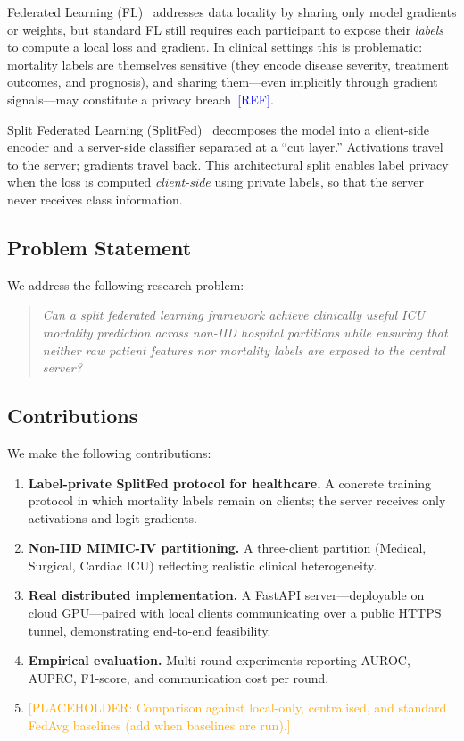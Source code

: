 \documentclass[10pt,twocolumn]{article}
\newcommand{\placeholder}[1]{\textcolor{orange}{[PLACEHOLDER: #1]}}
\newcommand{\refneeded}{\textcolor{blue}{[REF]}}
\begin{document}
Federated Learning (FL)~\cite{mcmahan2017} addresses data locality by
sharing only model gradients or weights, but standard FL still
requires each participant to expose their \emph{labels} to compute a
local loss and gradient.  In clinical settings this is problematic:
mortality labels are themselves sensitive (they encode disease
severity, treatment outcomes, and prognosis), and sharing them---even
implicitly through gradient signals---may constitute a privacy
breach~\refneeded.

Split Federated Learning (SplitFed)~\cite{thapa2022} decomposes the
model into a client-side encoder and a server-side classifier separated
at a ``cut layer.''  Activations travel to the server; gradients travel
back.  This architectural split enables label privacy when the loss is
computed \emph{client-side} using private labels, so that the server
never receives class information.

\subsection{Problem Statement}

We address the following research problem:
\begin{quote}
\emph{Can a split federated learning framework achieve clinically
useful ICU mortality prediction across non-IID hospital partitions
while ensuring that neither raw patient features nor mortality labels
are exposed to the central server?}
\end{quote}

\subsection{Contributions}

We make the following contributions:
\begin{enumerate}[leftmargin=*, label=\textbf{C\arabic*.}]
  \item \textbf{Label-private SplitFed protocol for healthcare.}
        A concrete training protocol in which mortality labels remain
        on clients; the server receives only activations and
        logit-gradients.
  \item \textbf{Non-IID MIMIC-IV partitioning.}
        A three-client partition (Medical, Surgical, Cardiac ICU)
        reflecting realistic clinical heterogeneity.
  \item \textbf{Real distributed implementation.}
        A FastAPI server---deployable on cloud GPU---paired with local
        clients communicating over a public HTTPS tunnel, demonstrating
        end-to-end feasibility.
  \item \textbf{Empirical evaluation.}
        Multi-round experiments reporting AUROC, AUPRC, F1-score, and
        communication cost per round.
  \item \placeholder{Comparison against local-only, centralised, and
        standard FedAvg baselines (add when baselines are run).}
\end{enumerate}
\end{document}
